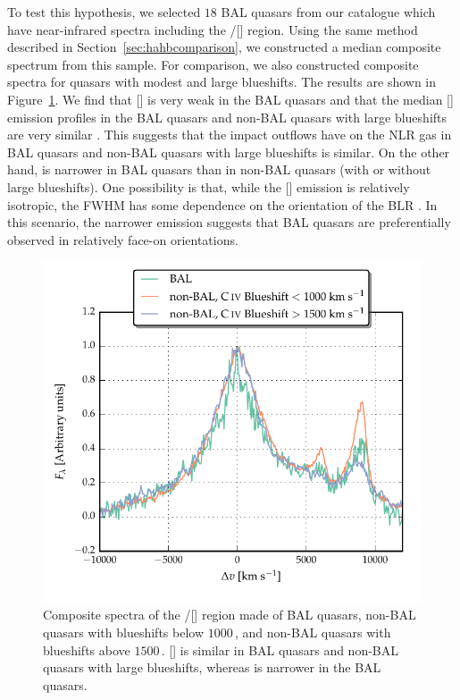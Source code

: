 To test this hypothesis, we selected $18$  BAL quasars from our catalogue which have near-infrared spectra including the \hbns/[] region. 
Using the same method described in Section~\ref{sec:hahbcomparison}, we constructed a median composite spectrum from this sample. 
For comparison, we also constructed composite spectra for quasars with modest and large  blueshifts. 
The results are shown in Figure~\ref{fig:bal_composite}. 
We find that [] is very weak in the BAL quasars and that the median [] emission profiles in the BAL quasars and non-BAL quasars with large  blueshifts are very similar \citep[e.g.][]{yuan03}.
This suggests that the impact outflows have on the NLR gas in BAL quasars and non-BAL quasars with large  blueshifts is similar.  
On the other hand, \hb is narrower in BAL quasars than in non-BAL quasars (with or without large  blueshifts).
One possibility is that, while the [] emission is relatively isotropic, the \hb FWHM has some dependence on the orientation of the BLR \citep[e.g.][]{shen14}.
In this scenario, the narrower \hb emission suggests that BAL quasars are preferentially observed in relatively face-on orientations. 

\begin{figure}[t!]
    \centering
    \includegraphics[width=0.8\linewidth]{figures/chapter04/bal_composite.pdf}
    \caption[{Comparison of the \hbns/[] region for BAL and non-BAL quasars.}]{Composite spectra of the \hbns/[] region made of BAL quasars, non-BAL quasars with  blueshifts below $1000$\,\kms, and non-BAL quasars with  blueshifts above $1500$\,\kms. [] is similar in BAL quasars and non-BAL quasars with large  blueshifts, whereas \hb is narrower in the BAL quasars.}
    \label{fig:bal_composite}
\end{figure}

